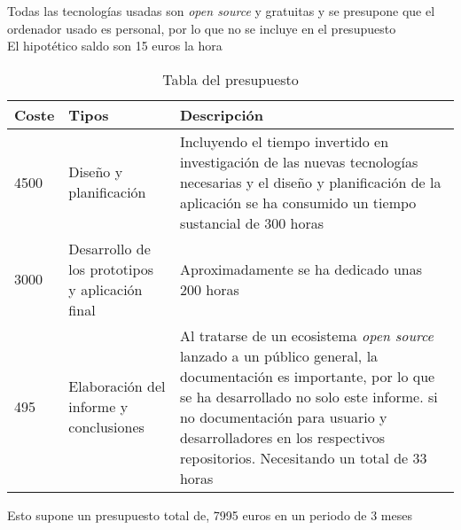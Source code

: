 Todas las tecnologías usadas son \emph{open source} y gratuitas y se presupone que el ordenador usado es personal, por lo que no se incluye en el presupuesto\\
El hipotético saldo son 15 euros la hora

\begin{comment}
\begin{center}
\begin{tabu} to 0.8\textwidth {| X[l] | X[l] | X[l] |}
 \hline
 \multicolumn{1}{|c|}{\bf Coste} & \multicolumn{1}{|c|}{\bf Tipos} & \multicolumn{1}{|c|}{\bf Descripción} \\
 \hline 4500 & Formación y Diseño & La formación en nuevas tecnologías y el diseño de la aplicación han consumido un tiempo sustancial de 300 horas\\
 \hline
 3000  & Desarrollo de los prototipos y aplicación final & Aproximadamente se ha dedicado unas 200 horas\\
 \hline
 120 & Elaboración del informe y conclusiones  & Al tratarse de un ecosistema \emph{open source} lanzado a un público general, la documentación es importante, por lo que se ha desarrollado no solo este informe. si no documentación para usuario y desarrolladores en los respectivos repositorios. \\
 \hline
\end{tabu}
\end{center}
\end{comment}
\begin{table}[H]
    \centering
    \begin{tabular}{|m{1cm}|m{4cm}|m{10cm}|}
    \hline
    \textbf{Coste} & \textbf{Tipos} & \textbf{Descripción}\\
    \hline
    4500 & Diseño y planificación & Incluyendo el tiempo invertido en investigación de las nuevas tecnologías necesarias y el diseño y planificación de la aplicación se ha consumido un tiempo sustancial de 300 horas\\
    \hline
    3000  & Desarrollo de los prototipos y aplicación final & Aproximadamente se ha dedicado unas 200 horas\\
    \hline
    495 & Elaboración del informe y conclusiones  & Al tratarse de un ecosistema \emph{open source} lanzado a un público general, la documentación es importante, por lo que se ha desarrollado no solo este informe. si no documentación para usuario y desarrolladores en los respectivos repositorios. Necesitando un total de 33 horas\\
    \hline
    \end{tabular}
    \caption{Tabla del presupuesto}
    \label{tab:budget}
\end{table}

\begin{comment}
   \begin{table}[htb]
   \centering
   \caption{Presupuesto}
   \label{table:presupuesto}
\end{table} 
\end{comment}

Esto supone un presupuesto total de, 7995 euros en un periodo de 3 meses